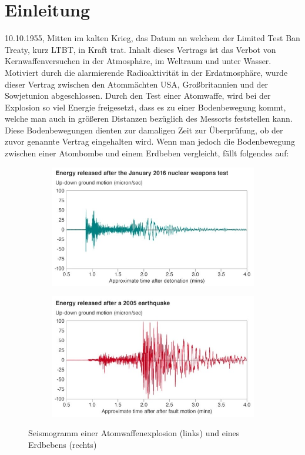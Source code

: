 \documentclass[a4paper,12pt]{article}
\theoremstyle{definition}
\theoremstyle{remark}
\begin{document}
\section{Einleitung}
10.10.1955, Mitten im kalten Krieg, das Datum an welchem der Limited Test Ban Treaty, kurz LTBT, in Kraft trat. Inhalt 
dieses Vertrags ist das Verbot von Kernwaffenversuchen in der Atmosphäre, im Weltraum und unter Wasser. Motiviert durch 
die alarmierende Radioaktivität in der Erdatmosphäre, wurde dieser Vertrag zwischen den Atommächten USA, Großbritannien 
und der Sowjetunion abgeschlossen. Durch den Test einer Atomwaffe, wird bei der Explosion so viel Energie freigesetzt, 
dass es zu einer Bodenbewegung kommt, welche man auch in größeren Distanzen bezüglich des Messorts feststellen kann. Diese 
Bodenbewegungen dienten zur damaligen Zeit zur Überprüfung, ob der zuvor genannte Vertrag eingehalten wird. Wenn man jedoch 
die Bodenbewegung zwischen einer Atombombe und einem Erdbeben vergleicht, fällt folgendes auf:
\begin{figure}[H]
\centering
\begin{subfigure}[b]{0.49\textwidth}
    \centering
    \includegraphics[width=\textwidth]{Bilder/bomb.jpg}
    \label{fig:bild1}
\end{subfigure}
\hfill
\begin{subfigure}[b]{0.49\textwidth}
    \centering
    \includegraphics[width=\textwidth]{Bilder/eq.jpg}
    \label{fig:bild2}
\end{subfigure}
\caption{Seismogramm einer Atomwaffenexplosion (links) und eines Erdbebens (rechts)}
\label{fig:zwei_bilder}
\end{figure}
\end{document}
